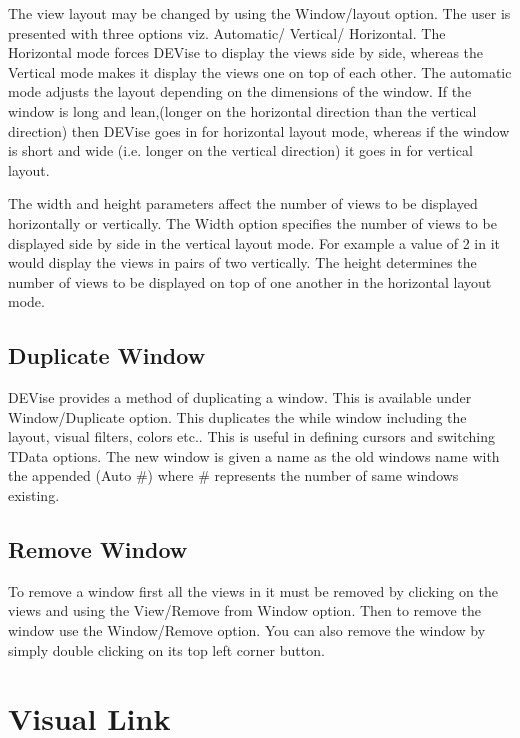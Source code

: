 The view layout may be changed by using the Window/layout option. The user is presented with three options viz. Automatic/ Vertical/ Horizontal. The Horizontal mode forces DEVise to display the views side by side, whereas the Vertical mode makes it display the views one on top of each other. The automatic mode adjusts the layout depending on the dimensions of the window. If the window is long and lean,(longer on the horizontal direction than the vertical direction) then DEVise goes in for horizontal layout mode, whereas if the window is short and wide (i.e. longer on the vertical direction) it goes in for vertical layout. 

The width and height parameters affect the number of views to be displayed horizontally or vertically. The Width option specifies the number of views to be displayed side by side in the vertical layout mode. For example a value of 2 in it would display the views in pairs of two vertically. The height determines the number of views to be displayed on top of one another in the horizontal layout mode.

\subsection{Duplicate Window}

DEVise provides a method of duplicating a window. This is available under Window/Duplicate option. This duplicates the while window including the layout, visual filters, colors etc.. This is useful in defining cursors and switching TData options. The new window is given a name as the old windows name with the appended (Auto \#) where \# represents the number of  same windows existing.


\subsection{Remove Window}

To remove a window first all the views in it must be removed by clicking on the views and using the View/Remove from Window option. Then to remove the window use the Window/Remove option. You can also remove the window by simply double clicking on its top left corner button.


\section{Visual Link}

